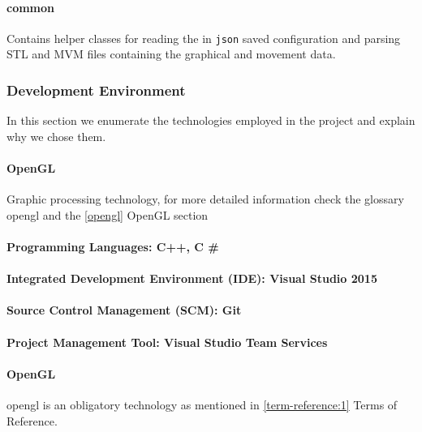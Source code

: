 \paragraph{common} Contains helper classes for reading the in \verb|json| saved configuration and parsing \acrshort{STL} and \acrshort{MVM} files containing the graphical and movement data.


\subsubsection{Development Environment} \label{tooling}


In this section we enumerate the technologies employed in the project and explain why we chose them.


\paragraph{OpenGL} Graphic processing technology, for more detailed information check the glossary \gls{opengl} and the \ref{opengl} OpenGL section


\paragraph{Programming Languages: C++, C \#}

\paragraph{Integrated Development Environment (IDE): Visual Studio 2015}

\paragraph{Source Control Management (SCM): Git} 

\paragraph{Project Management Tool: Visual Studio Team Services \cite{visualstudioteamservices} } 


\paragraph{OpenGL} \gls{opengl} is an obligatory technology as mentioned in \ref{term-reference:1} Terms of Reference.


